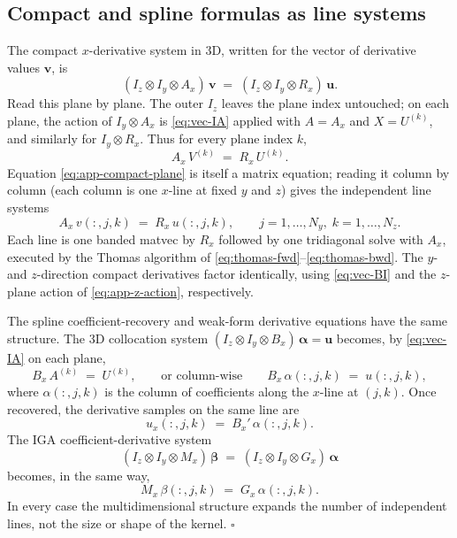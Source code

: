 \documentclass[11pt]{article}
\newcommand{\kron}{\otimes}
\newcommand{\Iy}{I_{y}}
\newcommand{\Iz}{I_{z}}
\newcommand{\Ax}{A_{x}}
\newcommand{\Rx}{R_{x}}
\begin{document}
\begin{appendices}
\subsection{Compact and spline formulas as line systems}
\label{app:factorized-lines}

The compact $x$-derivative system in 3D, written for the vector of
derivative values $\bm{v}$, is
\begin{equation*}
  (\Iz \kron \Iy \kron \Ax)\,\bm{v}
  \;=\;
  (\Iz \kron \Iy \kron \Rx)\,\bm{u}.
\end{equation*}
Read this plane by plane.  The outer $\Iz$ leaves the plane index
untouched; on each plane, the action of $\Iy \kron \Ax$ is
\eqref{eq:vec-IA} applied with $A = \Ax$ and $X = U^{(k)}$, and
similarly for $\Iy \kron \Rx$.  Thus for every plane index $k$,
\begin{equation}
\label{eq:app-compact-plane}
  \Ax\, V^{(k)} \;=\; \Rx\, U^{(k)}.
\end{equation}
Equation \eqref{eq:app-compact-plane} is itself a matrix equation;
reading it column by column (each column is one $x$-line at fixed
$y$ and $z$) gives the independent line systems
\begin{equation}
\label{eq:app-compact-line}
  \Ax\, v(:,j,k)
  \;=\;
  \Rx\, u(:,j,k),
  \qquad
  j = 1, \ldots, N_y,\;
  k = 1, \ldots, N_z.
\end{equation}
Each line is one banded matvec by $\Rx$ followed by one tridiagonal
solve with $\Ax$, executed by the Thomas algorithm of
\eqref{eq:thomas-fwd}--\eqref{eq:thomas-bwd}.  The $y$- and
$z$-direction compact derivatives factor identically, using
\eqref{eq:vec-BI} and the $z$-plane action of
\eqref{eq:app-z-action}, respectively.

The spline coefficient-recovery and weak-form derivative equations
have the same structure.  The 3D collocation system
$(\Iz \kron \Iy \kron B_x)\,\bm{\alpha} = \bm{u}$ becomes, by
\eqref{eq:vec-IA} on each plane,
\begin{equation}
  B_x\, A^{(k)} \;=\; U^{(k)},
  \qquad\text{or column-wise}\qquad
  B_x\, \alpha(:,j,k) \;=\; u(:,j,k),
\end{equation}
where $\alpha(:,j,k)$ is the column of coefficients along the
$x$-line at $(j,k)$.  Once recovered, the derivative samples on the
same line are
\begin{equation*}
  u_x(:,j,k) \;=\; B_x'\,\alpha(:,j,k).
\end{equation*}
The IGA coefficient-derivative system
\begin{equation*}
  (\Iz \kron \Iy \kron M_x)\,\bm{\beta}
  \;=\;
  (\Iz \kron \Iy \kron G_x)\,\bm{\alpha}
\end{equation*}
becomes, in the same way,
\begin{equation}
  M_x\, \beta(:,j,k)
  \;=\;
  G_x\, \alpha(:,j,k).
\end{equation}
In every case the multidimensional structure expands the number of
independent lines, not the size or shape of the kernel.  $\square$

\end{appendices}
\end{document}
